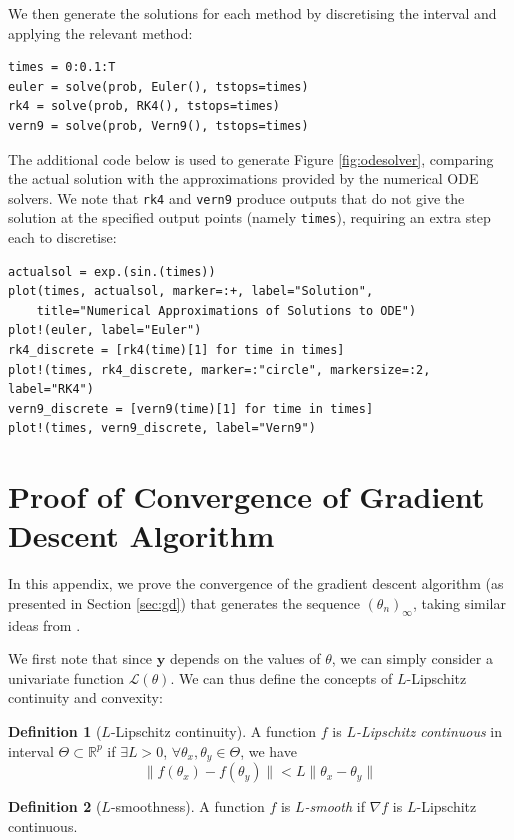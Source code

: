 \documentclass[a4paper,11pt,titlepage]{article}
\theoremstyle{definition}
\newtheorem{definition}{Definition}[section]
\theoremstyle{plain}
\theoremstyle{remark}
\begin{document}
We then generate the solutions for each method by discretising the interval and applying the relevant method:
\begin{verbatim}
times = 0:0.1:T
euler = solve(prob, Euler(), tstops=times)
rk4 = solve(prob, RK4(), tstops=times)
vern9 = solve(prob, Vern9(), tstops=times)
\end{verbatim}

The additional code below is used to generate Figure \ref{fig:odesolver}, comparing the actual solution with the approximations provided by the numerical ODE solvers. We note that \texttt{rk4} and \texttt{vern9} produce outputs that do not give the solution at the specified output points (namely \texttt{times}), requiring an extra step each to discretise:
\begin{verbatim}
actualsol = exp.(sin.(times))
plot(times, actualsol, marker=:+, label="Solution", 
    title="Numerical Approximations of Solutions to ODE")
plot!(euler, label="Euler")
rk4_discrete = [rk4(time)[1] for time in times]
plot!(times, rk4_discrete, marker=:"circle", markersize=:2, label="RK4")
vern9_discrete = [vern9(time)[1] for time in times]
plot!(times, vern9_discrete, label="Vern9")
\end{verbatim}

\pagebreak
\section{Proof of Convergence of Gradient Descent Algorithm}
\label{sec:gdproof}

In this appendix, we prove the convergence of the gradient descent algorithm (as presented in Section \ref{sec:gd}) that generates the sequence $(\theta_n)_\infty$, taking similar ideas from \cite{gower2015}.

We first note that since $\mathbf{\hat{y}}$ depends on the values of $\theta$, we can simply consider a univariate function $\mathcal{L}(\theta)$. We can thus define the concepts of $L$-Lipschitz continuity and convexity:

\begin{definition}[$L$-Lipschitz continuity]
    A function $f$ is $L$\textit{-Lipschitz continuous} in interval $\Theta \subset \mathbb{R}^p$ if $\exists L > 0$, $\forall \theta_x, \theta_y \in \Theta$, we have
    $$
    \|f(\theta_x) - f(\theta_y)\| < L \| \theta_x - \theta_y\|
    $$
\end{definition}

\begin{definition}[$L$-smoothness]
    A function $f$ is $L$\textit{-smooth} if $\nabla f$ is $L$-Lipschitz continuous.
\end{definition}
\end{document}
